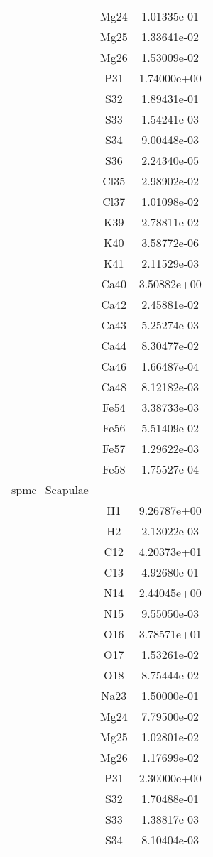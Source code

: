 \begin{centering}
\begin{longtable}{l c c}
& Mg24 & 1.01335e-01 \\ 
& Mg25 & 1.33641e-02 \\ 
& Mg26 & 1.53009e-02 \\ 
& P31 & 1.74000e+00 \\ 
& S32 & 1.89431e-01 \\ 
& S33 & 1.54241e-03 \\ 
& S34 & 9.00448e-03 \\ 
& S36 & 2.24340e-05 \\ 
& Cl35 & 2.98902e-02 \\ 
& Cl37 & 1.01098e-02 \\ 
& K39 & 2.78811e-02 \\ 
& K40 & 3.58772e-06 \\ 
& K41 & 2.11529e-03 \\ 
& Ca40 & 3.50882e+00 \\ 
& Ca42 & 2.45881e-02 \\ 
& Ca43 & 5.25274e-03 \\ 
& Ca44 & 8.30477e-02 \\ 
& Ca46 & 1.66487e-04 \\ 
& Ca48 & 8.12182e-03 \\ 
& Fe54 & 3.38733e-03 \\ 
& Fe56 & 5.51409e-02 \\ 
& Fe57 & 1.29622e-03 \\ 
& Fe58 & 1.75527e-04 \\ 
\hline
spmc\_Scapulae & & \\
\hline
& H1 & 9.26787e+00 \\ 
& H2 & 2.13022e-03 \\ 
& C12 & 4.20373e+01 \\ 
& C13 & 4.92680e-01 \\ 
& N14 & 2.44045e+00 \\ 
& N15 & 9.55050e-03 \\ 
& O16 & 3.78571e+01 \\ 
& O17 & 1.53261e-02 \\ 
& O18 & 8.75444e-02 \\ 
& Na23 & 1.50000e-01 \\ 
& Mg24 & 7.79500e-02 \\ 
& Mg25 & 1.02801e-02 \\ 
& Mg26 & 1.17699e-02 \\ 
& P31 & 2.30000e+00 \\ 
& S32 & 1.70488e-01 \\ 
& S33 & 1.38817e-03 \\ 
& S34 & 8.10404e-03 \\ 

\end{longtable}
\end{centering}
